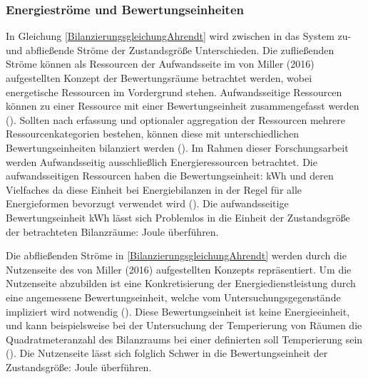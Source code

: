 
\subsubsection{Energieströme und Bewertungseinheiten}
In Gleichung \eqref{BilanzierungsgleichungAhrendt} wird zwischen in das System zu- und abfließende Ströme der Zustandsgröße Unterschieden.
Die zufließenden Ströme können als Ressourcen der Aufwandsseite im von Miller (2016) aufgestellten Konzept der Bewertungsräume betrachtet werden, 
wobei energetische Ressourcen im Vordergrund stehen. Aufwandsseitige Ressourcen können zu einer Ressource mit einer Bewertungseinheit 
zusammengefasst werden (\cite[S. 112]{Miller.2016}). Sollten nach erfassung und optionaler aggregation der Ressourcen mehrere Ressourcenkategorien bestehen, 
können diese mit unterschiedlichen Bewertungseinheiten bilanziert werden (\cite[S. 112]{Miller.2016}). Im Rahmen dieser Forschungsarbeit werden 
Aufwandsseitig ausschließlich Energieressourcen betrachtet.
Die aufwandsseitigen Ressourcen haben die Bewertungseinheit: kWh und deren Vielfaches da diese Einheit bei Energiebilanzen in der Regel für alle 
Energieformen bevorzugt verwendet wird (\cite[S. 65]{Konstantin.2023}). Die aufwandsseitige Bewertungseinheit kWh lässt sich Problemlos in die Einheit der 
Zustandsgröße der betrachteten Bilanzräume: Joule überführen.

Die abfließenden Ströme in \eqref{BilanzierungsgleichungAhrendt} werden durch die Nutzenseite des von Miller (2016) aufgestellten Konzepts repräsentiert.
Um die Nutzenseite abzubilden ist eine Konkretisierung der Energiedienstleistung durch eine angemessene Bewertungseinheit, 
welche vom Untersuchungsgegenstände impliziert wird notwendig (\cite{Miller.2016}). Diese Bewertungseinheit ist keine Energieeinheit, und 
kann beispielsweise bei der Untersuchung der Temperierung von Räumen die Quadratmeteranzahl des Bilanzraums bei einer definierten 
soll Temperierung sein (\cite{Miller.2016}). Die Nutzenseite lässt sich folglich Schwer in die Bewertungseinheit der Zustandsgröße: Joule 
überführen. 

